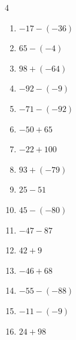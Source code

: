 \begin{multicols}{4}
\begin{enumerate}
        \phantom{$=-28$}

  \item $-17-(-36)$

        \phantom{$=19$}

  \item $65-(-4)$

        \phantom{$=69$}

\columnbreak %

  \item $98+(-64)$

        \phantom{$=34$}

  \item $-92-(-9)$

        \phantom{$=-83$}

  \item $-71-(-92)$

        \phantom{$=21$}

  \item $-50+65$

        \phantom{$=15$}

  \item $-22+100$

        \phantom{$=78$}

  \item $93+(-79)$

        \phantom{$=14$}

  \item $25-51$

        \phantom{$=-26$}

  \item $45-(-80)$

        \phantom{$=125$}

  \item $-47-87$

        \phantom{$=-134$}

  \item $42+9$

        \phantom{$=51$}

  \item $-46+68$

        \phantom{$=22$}

  \item $-55-(-88)$

        \phantom{$=33$}

  \item $-11-(-9)$

        \phantom{$=-2$}

  \item $24+98$


\end{enumerate}
\end{multicols}
